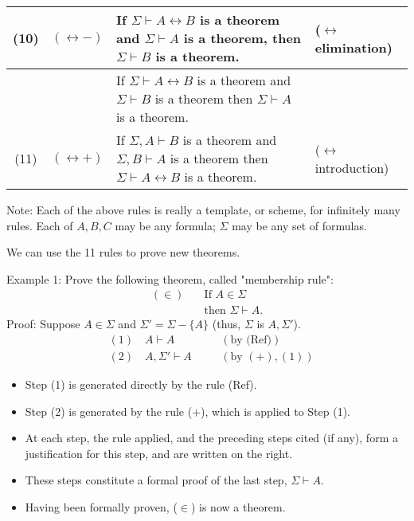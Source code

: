 \documentclass{article}
\begin{document}
\begin{table}[h]
\begin{tabular}{ccp{6cm}p{4cm}}
         (10) & $(\leftrightarrow -)$ & {If $\Sigma \vdash A \leftrightarrow B$ is a theorem and \newline $\Sigma \vdash A$ is a theorem, \newline then $\Sigma \vdash B$ is a theorem.} & ($\leftrightarrow$ elimination)\\ \hline
         & &{If $\Sigma \vdash A \leftrightarrow B$ is a theorem and \newline $\Sigma \vdash B$ is a theorem \newline then $\Sigma \vdash A$ is a theorem.} & \\ \hline
         (11) & $(\leftrightarrow +)$ & {If $\Sigma, A \vdash B$ is a theorem and \newline $\Sigma, B \vdash A$ is a theorem \newline then $\Sigma \vdash A \leftrightarrow B$ is a theorem.} & ($\leftrightarrow$ introduction)\\ \hline
    \end{tabular}
\end{table}

Note: Each of the above rules is really a template, or scheme, for infinitely many rules. Each of $A, B, C$ may be any formula; $\Sigma$ may be any set of formulas.

We can use the 11 rules to prove new theorems.

Example 1: Prove the following theorem, called "membership rule":
\begin{align*}
(\in) \quad &\text{If } A \in \Sigma \\
&\text{then } \Sigma \vdash A.
\end{align*}
Proof: Suppose $A \in \Sigma$ and $\Sigma' = \Sigma - \{A\}$ (thus, $\Sigma$ is $A, \Sigma'$).
\begin{align*}
&(1) \quad A \vdash A \quad &&(\text{by (Ref)}) \\
&(2) \quad A, \Sigma' \vdash A \quad &&(\text{by } (+), (1))
\end{align*}

\begin{itemize}
    \item Step (1) is generated directly by the rule (Ref).
    \item Step (2) is generated by the rule ($+$), which is applied to Step (1).
    \item At each step, the rule applied, and the preceding steps cited (if any), form a justification for this step, and are written on the right.
    \item These steps constitute a formal proof of the last step, $\Sigma \vdash A$.
    \item Having been formally proven, ($\in$) is now a theorem.
\end{itemize}
\end{document}
